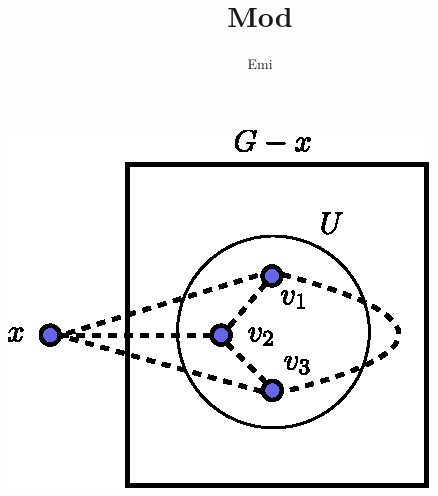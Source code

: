 \documentclass[]{article}
\title{Mod}
\author{Emi}
\begin{document}
	
	\maketitle
	\includegraphics{U_G-x.eps}
	
\end{document}

